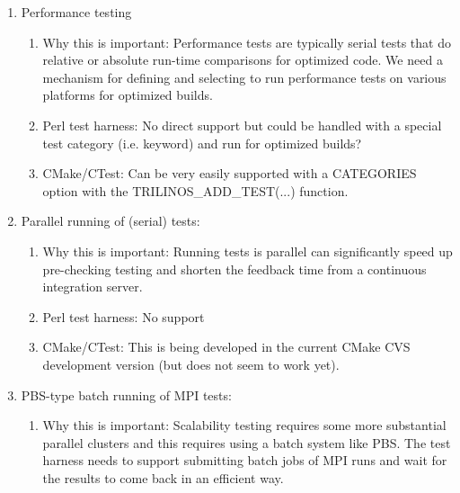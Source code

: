 \documentclass[pdf,ps2pdf,11pt]{SANDreport}
\begin{document}
\begin{enumerate}

{}\item Performance testing

  \begin{enumerate}

  {}\item Why this is important: Performance tests are typically
  serial tests that do relative or absolute run-time comparisons for
  optimized code.  We need a mechanism for defining and selecting to
  run performance tests on various platforms for optimized builds.

  {}\item Perl test harness: No direct support but could be handled
  with a special test category (i.e. keyword) and run for optimized
  builds?

  {}\item CMake/CTest: Can be very easily supported with a CATEGORIES
  option with the TRILINOS\_ADD\_TEST(...) function.

  \end{enumerate}

{}\item Parallel running of (serial) tests:

  \begin{enumerate}

  {}\item Why this is important: Running tests is parallel can
  significantly speed up pre-checking testing and shorten the feedback
  time from a continuous integration server.

  {}\item Perl test harness: No support

  {}\item CMake/CTest: This is being developed in the current CMake
  CVS development version (but does not seem to work yet).

  \end{enumerate}

{}\item PBS-type batch running of MPI tests:

  \begin{enumerate}

  {}\item Why this is important: Scalability testing requires some
  more substantial parallel clusters and this requires using a batch
  system like PBS.  The test harness needs to support submitting
  batch jobs of MPI runs and wait for the results to come back in an
  efficient way.


\end{enumerate}
\end{enumerate}
\end{document}
